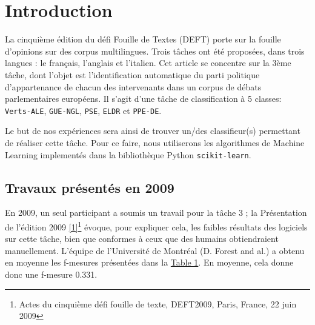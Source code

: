 \section{Introduction}

\par La cinquième édition du défi Fouille de Textes (DEFT) porte sur la fouille d'opinions sur des corpus multilingues. Trois tâches ont été proposées,
dans trois langues : le français, l'anglais et l'italien. Cet article se concentre sur la 3ème tâche, dont l'objet est l'identification automatique
du parti politique d'appartenance de chacun des intervenants dans un corpus de débats parlementaires européens. Il s'agit d'une tâche de classification à 5 classes:
\texttt{Verts-ALE}, \texttt{GUE-NGL}, \texttt{PSE}, \texttt{ELDR} et \texttt{PPE-DE}.

\par Le but de nos expériences sera ainsi de trouver un/des classifieur(s) permettant de réaliser cette tâche. Pour ce faire, nous utiliserons les algorithmes
de Machine Learning implementés dans la bibliothèque Python \texttt{scikit-learn}.

\subsection{Travaux présentés en 2009}




\begin{table}[h!]
\centering
\setlength{\tabcolsep}{5pt} %
\renewcommand{\arraystretch}{1.2} %
\caption{Moyennes des F-mesures par parti politique.}
\label{tab:moyennes_fmesures}
\end{table}


\par En 2009, un seul participant a soumis un travail pour la tâche 3 ; la Présentation de l'édition 2009 \hyperlink{ref1}{[1]}\footnote{Actes du cinquième défi fouille de texte, DEFT2009, Paris, France, 22 juin 2009} évoque, pour expliquer cela, les faibles résultats des logiciels sur cette tâche, bien que conformes à ceux que des humains obtiendraient manuellement. L'équipe de l'Université de Montréal (D. Forest and al.) a obtenu en moyenne les f-mesures présentées dans la \hyperref[tab:moyennes_fmesures]{Table 1}. En moyenne, cela donne donc une f-mesure 0.331.

